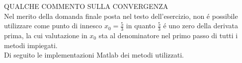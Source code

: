 \noindent QUALCHE COMMENTO SULLA CONVERGENZA\\

\noindent Nel merito della domanda finale posta nel testo dell'esercizio, non \'e possibile utilizzare come punto di innesco \(x_0=\frac{5}{3}\) in quanto \(\frac{5}{3}\) \'e uno zero della derivata prima, la cui valutazione in \(x_0\) sta al denominatore nel primo passo di tutti i metodi impiegati.\\

\noindent Di seguito le implementazioni Matlab dei metodi utilizzati.


